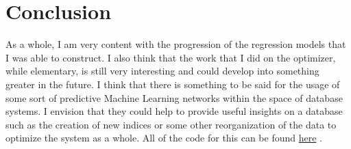 \documentclass[sigconf]{acmart}
\begin{document}
\section{Conclusion}
As a whole, I am very content with the progression of the regression models that I was able to construct. I also think that the work that I did on the optimizer, while elementary, is still very interesting and could develop
into something greater in the future. I think that there is something to be said for the usage of some sort of predictive Machine Learning networks within the space of database systems. I envision that they could help to 
provide useful insights on a database such as the creation of new indices or some other reorganization of the data to optimize the system as a whole. All of the code for this can be found \href{https://github.com/austin-bmitchell15/sqlopt/tree/main}{here} \cite{mitchell2025sqlopt}.



\end{document}
